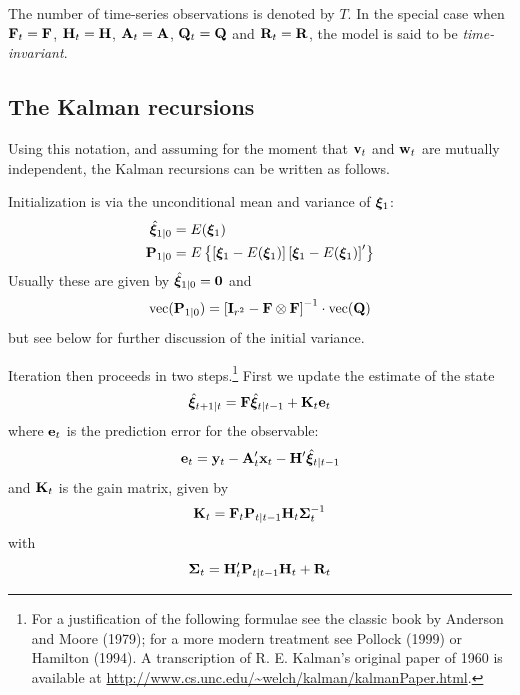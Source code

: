 \documentclass[a4paper]{article}
\newcommand{\obsvec}{\ensuremath\mathbf{y}}
\newcommand{\obsmat}{\ensuremath\mathbf{H}}
\newcommand{\obsx}{\ensuremath\mathbf{x}}
\newcommand{\obsxmat}{\ensuremath\mathbf{A}}
\newcommand{\obsdist}{\ensuremath\mathbf{w}}
\newcommand{\obsvar}{\ensuremath\mathbf{R}}
\newcommand{\statevec}{\ensuremath\mathbf{\bm \xi}}
\newcommand{\statemat}{\ensuremath\mathbf{F}}
\newcommand{\strdist}{\ensuremath\mathbf{v}}
\newcommand{\strvar}{\ensuremath\mathbf{Q}}
\newcommand{\statevar}{\ensuremath\mathbf{P}}
\newcommand{\gain}{\ensuremath\mathbf{K}}
\newcommand{\prederr}{\ensuremath\mathbf{e}}
\newcommand{\predvar}{\ensuremath{\bm\Sigma}}
\newcommand{\myvec}{\mbox{vec}}
\begin{document}
The number of time-series observations is denoted by $T$.
In the special case when $\statemat_t = \statemat$, $\obsmat_t = \obsmat$,
$\obsxmat_t = \obsxmat$, $\strvar_t = \strvar$ and $\obsvar_t =
\obsvar$, the model is said to be \emph{time-invariant}.

\subsection{The Kalman recursions}
\label{sec:kalman-recursions}

Using this notation, and assuming for the moment that $\strdist_t$ and
$\obsdist_t$ are mutually independent, the Kalman recursions can be
written as follows.

Initialization is via the unconditional mean and variance of
$\statevec_1$:
%
\begin{align*}
\hat{\statevec}_{1|0} &= E(\statevec_1) \\
\statevar_{1|0} &= E\left\{\left[\statevec_1 - E(\statevec_1)\right]
   \left[\statevec_1 - E(\statevec_1)\right]' \right\}
\end{align*}
%
Usually these are given by $\hat{\statevec}_{1|0} = \mathbf{0}$ and
%
\begin{equation}
\label{eq:inivar}
\myvec(\statevar_{1|0}) = \left[\mathbf{I}_{r^2} - \statemat \otimes
  \statemat\right]^{-1} \cdot \myvec(\strvar)
\end{equation}
but see below for further discussion of the initial variance.

Iteration then proceeds in two steps.\footnote{For a justification of
  the following formulae see the classic book by Anderson and Moore
  (1979); for a more modern treatment see Pollock (1999) or Hamilton
  (1994).  A transcription of R. E. Kalman's original paper of 1960 is
  available at
  \url{http://www.cs.unc.edu/~welch/kalman/kalmanPaper.html}.}  First
we update the estimate of the state
%
\begin{equation}
\hat{\statevec}_{t+1|t} = \statemat\hat{\statevec}_{t|t-1} + 
  \gain_t \prederr_t
\end{equation}
%
where $\prederr_t$ is the prediction error for the observable:
\[
\prederr_t = \obsvec_t - \obsxmat_t'\obsx_t - \obsmat' \hat{\statevec}_{t|t-1}
\]
%
and $\gain_t$ is the gain matrix, given by
%
\begin{equation}
\label{eq:gain}
\gain_t = \statemat_t\statevar_{t|t-1}\obsmat_t \predvar_t^{-1}
\end{equation}
%
with
%
\[
\predvar_t = \obsmat_t'\statevar_{t|t-1}\obsmat_t + \obsvar_t
\]
\end{document}

